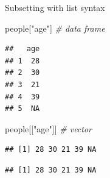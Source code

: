 \documentclass[ignorenonframetext,]{beamer}
\newenvironment{Shaded}{\begin{snugshade}}{\end{snugshade}}
\newcommand{\CommentTok}[1]{\textcolor[rgb]{0.56,0.35,0.01}{\textit{#1}}}
\newcommand{\NormalTok}[1]{#1}
\newcommand{\OperatorTok}[1]{\textcolor[rgb]{0.81,0.36,0.00}{\textbf{#1}}}
\newcommand{\StringTok}[1]{\textcolor[rgb]{0.31,0.60,0.02}{#1}}
\begin{document}
\begin{frame}[fragile]{Subsetting with list syntax}
\protect\hypertarget{subsetting-with-list-syntax-2}{}

\begin{Shaded}
\begin{Highlighting}[]
\NormalTok{people[}\StringTok{"age"}\NormalTok{] }\CommentTok{# data frame}
\end{Highlighting}
\end{Shaded}

\begin{verbatim}
##   age
## 1  28
## 2  30
## 3  21
## 4  39
## 5  NA
\end{verbatim}

\begin{Shaded}
\begin{Highlighting}[]
\NormalTok{people[[}\StringTok{"age"}\NormalTok{]] }\CommentTok{# vector}
\end{Highlighting}
\end{Shaded}

\begin{verbatim}
## [1] 28 30 21 39 NA
\end{verbatim}

\begin{Shaded}
\end{Shaded}

\begin{verbatim}
## [1] 28 30 21 39 NA
\end{verbatim}

\end{frame}
\end{document}
